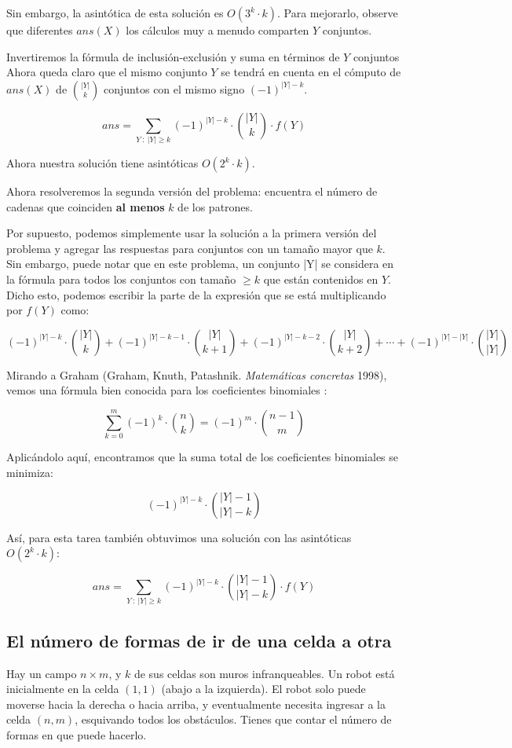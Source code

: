 Sin embargo, la asintótica de esta solución es $O(3^k \cdot k)$. Para mejorarlo, observe que diferentes $ans(X)$ los cálculos muy a menudo comparten $Y$ conjuntos.

Invertiremos la fórmula de inclusión-exclusión y suma en términos de $Y$ conjuntos Ahora queda claro que el mismo conjunto $Y$ se tendrá en cuenta en el cómputo de $ans(X)$ de $\binom{|Y|}{k}$ conjuntos con el mismo signo $(-1)^{|Y| - k}$.

$$ans = \sum_{Y ~ : ~ |Y| \ge k} (-1)^{|Y|-k} \cdot \binom{|Y|}{k} \cdot f(Y)$$

Ahora nuestra solución tiene asintóticas $O(2^k \cdot k)$.

Ahora resolveremos la segunda versión del problema: encuentra el número de cadenas que coinciden \textbf{al menos} $k$ de los patrones.

Por supuesto, podemos simplemente usar la solución a la primera versión del problema y agregar las respuestas para conjuntos con un tamaño mayor que $k$. Sin embargo, puede notar que en este problema, un conjunto |Y| se considera en la fórmula para todos los conjuntos con tamaño $\ge k$ que están contenidos en $Y$. Dicho esto, podemos escribir la parte de la expresión que se está multiplicando por $f(Y)$ como:

$$(-1)^{|Y|-k} \cdot \binom{|Y|}{k} + (-1)^{|Y|-k-1} \cdot \binom{|Y|}{k+1} + (-1)^{|Y|-k-2} \cdot \binom{|Y|}{k+2} + \cdots + (-1)^{|Y|-|Y|} \cdot \binom{|Y|}{|Y|}$$


Mirando a Graham (Graham, Knuth, Patashnik. \emph{Matemáticas concretas} 1998), vemos una fórmula bien conocida para los coeficientes binomiales :


$$\sum_{k=0}^m (-1)^k \cdot \binom{n}{k} = (-1)^m \cdot \binom{n-1}{m}$$

Aplicándolo aquí, encontramos que la suma total de los coeficientes binomiales se minimiza:

$$(-1)^{|Y|-k} \cdot \binom{|Y|-1}{|Y|-k}$$

Así, para esta tarea también obtuvimos una solución con las asintóticas $O(2^k \cdot k)$:

$$ans = \sum_{Y ~ : ~ |Y| \ge k} (-1)^{|Y|-k} \cdot \binom{|Y|-1}{|Y|-k} \cdot f(Y)$$

\subsection{El número de formas de ir de una celda a otra}

Hay un campo $n \times m$, y $k$ de sus celdas son muros infranqueables. Un robot está inicialmente en
la celda $(1,1)$ (abajo a la izquierda). El robot solo puede moverse hacia la derecha o hacia arriba, y 
eventualmente necesita ingresar a la celda $(n,m)$, esquivando todos los obstáculos. Tienes que contar 
el número de formas en que puede hacerlo.


